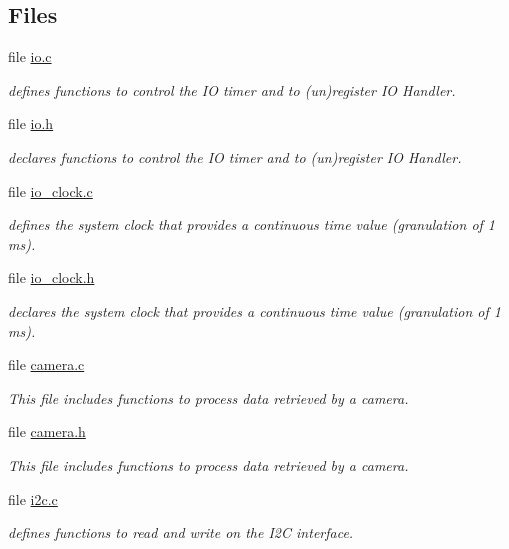 \subsection*{Files}
\begin{DoxyCompactItemize}
\item 
file \hyperlink{io_8c}{io.\+c}
\begin{DoxyCompactList}\small\item\em defines functions to control the I\+O timer and to (un)register I\+O Handler. \end{DoxyCompactList}\item 
file \hyperlink{io_8h}{io.\+h}
\begin{DoxyCompactList}\small\item\em declares functions to control the I\+O timer and to (un)register I\+O Handler. \end{DoxyCompactList}\item 
file \hyperlink{io__clock_8c}{io\+\_\+clock.\+c}
\begin{DoxyCompactList}\small\item\em defines the system clock that provides a continuous time value (granulation of 1 ms). \end{DoxyCompactList}\item 
file \hyperlink{io__clock_8h}{io\+\_\+clock.\+h}
\begin{DoxyCompactList}\small\item\em declares the system clock that provides a continuous time value (granulation of 1 ms). \end{DoxyCompactList}\item 
file \hyperlink{camera_8c}{camera.\+c}
\begin{DoxyCompactList}\small\item\em This file includes functions to process data retrieved by a camera. \end{DoxyCompactList}\item 
file \hyperlink{camera_8h}{camera.\+h}
\begin{DoxyCompactList}\small\item\em This file includes functions to process data retrieved by a camera. \end{DoxyCompactList}\item 
file \hyperlink{i2c_8c}{i2c.\+c}
\begin{DoxyCompactList}\small\item\em defines functions to read and write on the I2\+C interface. \end{DoxyCompactList}\item 

\end{DoxyCompactItemize}
